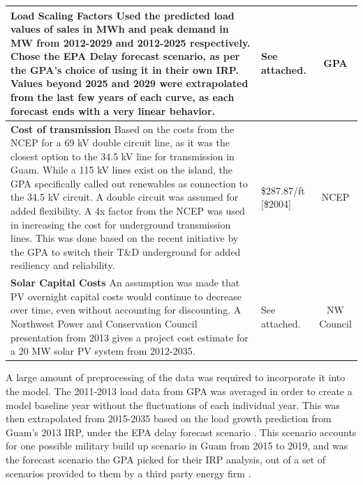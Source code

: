 \documentclass[12pt,letterpaper,fleqn]{article}
\begin{document}
\begin{center}
\begin{longtable}{| p{11cm} | p{3cm} | c | }
    \textbf{Load Scaling Factors} Used the predicted load values of
    sales in MWh and peak demand in MW from 2012-2029 and 2012-2025
    respectively. Chose the EPA Delay forecast scenario, as per the
    GPA's choice of using it in their own IRP. Values beyond 2025 and
    2029 were extrapolated from the last few years of each curve, as
    each forecast ends with a very linear behavior. & See attached. &
    GPA \cite{cruz13} \\\hline

    \textbf{Cost of transmission} Based on the costs from the NCEP for
    a 69 kV double circuit line, as it was the closest option to the
    34.5 kV line for transmission in Guam. While a 115 kV lines exist
    on the island, the GPA specifically called out renewables as
    connection to the 34.5 kV circuit. A double circuit was assumed
    for added flexibility. A 4x factor from the NCEP was used in
    increasing the cost for underground transmission lines. This was
    done based on the recent initiative by the GPA to switch their
    T\&D underground for added resiliency and reliability. &
    \$287.87/ft [\$2004] & NCEP \cite{brown04} \\\hline

    \textbf{Solar Capital Costs} An assumption was made that PV
    overnight capital costs would continue to decrease over time,
    even without accounting for discounting. A Northwest Power and
    Conservation Council presentation from 2013 gives a project cost
    estimate for a 20 MW solar PV system from 2012-2035.  & See
    attached. & NW Council \cite{simmons13} \\\hline
  \end{longtable}
\end{center}

A large amount of preprocessing of the data was required to
incorporate it into the model. The 2011-2013 load data from GPA was
averaged in order to create a model baseline year without the
fluctuations of each individual year. This was then extrapolated from
2015-2035 based on the load growth prediction from Guam's 2013 IRP,
under the EPA delay forecast scenario \cite{cruz13}. This scenario
accounts for one possible military build up scenario in Guam from 2015
to 2019, and was the forecast scenario the GPA picked for their IRP
analysis, out of a set of scenarios provided to them by a third party
energy firm \cite{cruz13}.
\end{document}
